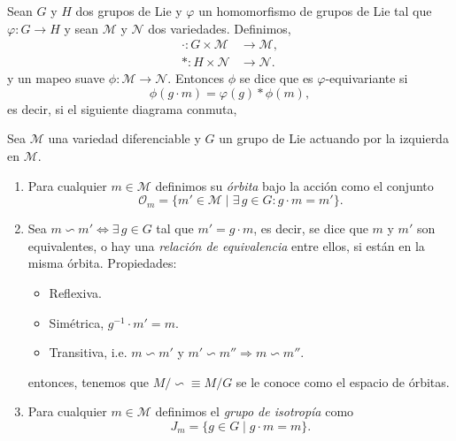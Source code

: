 \begin{mydef}
Sean $G$ y $H$ dos grupos de Lie y $\varphi$ un homomorfismo de grupos de Lie tal que $\varphi: G \rightarrow H$ y sean $\mathcal{M}$ y $\mathcal{N}$ dos variedades. Definimos,
%
\begin{align*}
\cdot : G \times \mathcal{M} & \longrightarrow \mathcal{M}, \\
* : H \times \mathcal{N} & \longrightarrow \mathcal{N}.
\end{align*}
%
y un mapeo suave $\phi: \mathcal{M} \rightarrow \mathcal{N}$.
Entonces $\phi$ se dice que es $\varphi$-equivariante si $$\phi(g \cdot m) = \varphi (g) * \phi(m),$$ es decir, si el siguiente diagrama conmuta,
%
\begin{center}
\end{center}
%
\end{mydef}

\begin{mydef}
Sea $\mathcal{M}$ una variedad diferenciable y $G$ un grupo de Lie actuando por la izquierda en $\mathcal{M}$.
%
\begin{enumerate}
\item{Para cualquier $m \in \mathcal{M}$ definimos su \emph{\'{o}rbita} bajo la acci\'{o}n como el conjunto $$\mathcal{O}_{m} = \{m' \in \mathcal{M} \; \vert \; \exists \, g \in G : g \cdot m = m'\}.$$}
\item{Sea $m \backsim m' \Leftrightarrow \exists \, g \in G$ tal que $m' = g \cdot m$, es decir, se dice que $m$ y $m'$ son equivalentes, o hay una \emph{relaci\'{o}n de equivalencia} entre ellos, si est\'{a}n en la misma \'{o}rbita. Propiedades:
%
\begin{itemize}
\item{Reflexiva.}
\item{Sim\'{e}trica, $g^{-1} \cdot m' = m$.}
\item{Transitiva, i.e. $m \backsim m'$ y $m' \backsim m'' \Rightarrow m \backsim m''$.}
\end{itemize}
%
entonces, tenemos que $M/\backsim \equiv M/G$ se le conoce como el espacio de \'{o}rbitas.}
\item{Para cualquier $m \in \mathcal{M}$ definimos el \emph{grupo de isotrop\'{i}a} como $$J_{m} = \{g \in G \; \vert \; g \cdot m = m\}.$$}
\end{enumerate}
%
\end{mydef}

